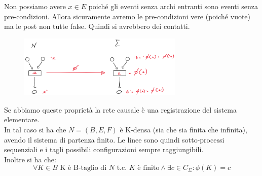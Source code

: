 \begin{definizione}
\begin{itemize}
\begin{itemize}
      \begin{nota}
      Non possiamo avere $x\in E$ poiché gli eventi senza archi entranti sono eventi senza pre-condizioni. Allora sicuramente avremo le pre-condizioni vere (poiché vuote) ma le post non tutte false. Quindi si avrebbero dei contatti.
      \end{nota}
    \end{itemize}
  \end{itemize}
  \begin{figure}[H]
          \centering
          \includegraphics[width=0.7\textwidth]{img/procnonseq.png}      
          \end{figure}
  Se abbiamo queste proprietà la rete causale è una registrazione del sistema
  elementare.\\
  In tal caso si ha che $N=(B, E, F)$ è K-densa (sia che sia finita che infinita),
  avendo il sistema di partenza finito. Le linee sono quindi sotto-processi
  sequenziali e i tagli possibili configurazioni sempre raggiungibili.\\
  Inoltre si ha che:
  \[\forall K\in B\mbox{ K è B-taglio di } N \mbox{ t.c. } K \mbox{ è finito}
    \land \exists c\in C_\Sigma:\phi(K)=c\]
\end{definizione} \vspace{5mm} %


